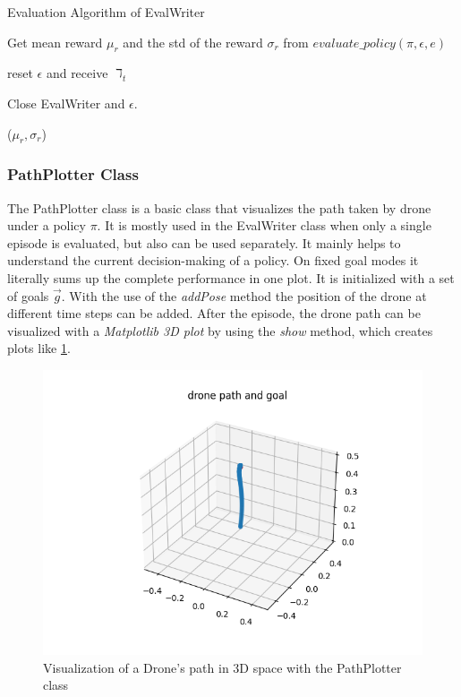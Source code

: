 \newpage

\begin{algorithm}
	\caption{Evaluation Algorithm of EvalWriter}
	\label{alg:evalwriter}
	
	Get mean reward $\mu_r$ and the std of the reward $\sigma_r$ from $evaluate\_policy (\pi , \epsilon, e)$
	
	reset $\epsilon$ and receive $\daleth_t$
	
	Close EvalWriter and $\epsilon$.
	
	\Return ($\mu_r, \sigma_r$)
	
\end{algorithm} 

\subsubsection{PathPlotter Class}
The PathPlotter class is a basic class that visualizes the path taken by drone under a policy $\pi$. 
It is mostly used in the EvalWriter class when only a single episode is evaluated, but also can be used separately.
It mainly helps to understand the current decision-making of a policy. On fixed goal modes it literally sums up the complete performance in one plot.
It is initialized with a set of goals $\overrightarrow{g}$. With the use of the \emph{addPose} method the position 
of the drone at different time steps can be added. 
After the episode, the drone path can be visualized with a \emph{Matplotlib 3D plot} by using the \emph{show} method, which creates plots like \cref{fig:path}.
 
 \begin{figure}[htp]
 	\centering
 	\includegraphics[height=0.35\linewidth]{figures/pathplotter.png}
 	\caption{Visualization of a Drone's path in 3D space with the PathPlotter class}
 	\label{fig:path}
 \end{figure}
